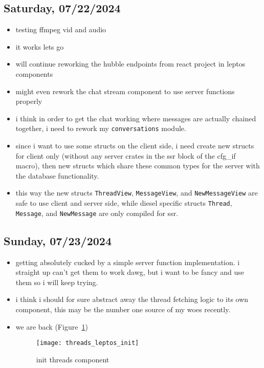 \subsection*{Saturday, 07/22/2024}
\begin{itemize}
    \item testing ffmpeg vid and audio
    \item it works lets go
    \item will continue reworking the hubble endpoints from react project in
        leptos components
    \item might even rework the chat stream component to use server functions
        properly
    \item i think in order to get the chat working where messages are actually
        chained together, i need to rework my \texttt{conversations} module.
    \item since i want to use some structs on the client side, i need create new
        structs for client only (without any server crates in the ssr block of
        the cfg_if macro), then new structs which share these common types for
        the server with the database functionality.
    \item this way the new structs \texttt{ThreadView}, \texttt{MessageView},
        and \texttt{NewMessageView} are safe to use client and server side,
        while diesel specific structs \texttt{Thread}, \texttt{Message}, and
        \texttt{NewMessage} are only compiled for ssr.
\end{itemize}

\subsection*{Sunday, 07/23/2024}
\begin{itemize}
    \item getting absolutely cucked by a simple server function implementation.
        i straight up can't get them to work dawg, but i want to be fancy and
        use them so i will keep trying.
    \item i think i should for sure abstract away the thread fetching logic to
        its own component, this may be the number one source of my woes
        recently.
    \item we are back (Figure~\ref{fig:threads_leptos_init})
        \begin{figure}[ht]
            \centering
            \texttt{[image: threads\_leptos\_init]}
            \captionsetup{labelfont=bf, textfont=it}
            \caption{init threads component}
            \label{fig:threads_leptos_init}
        \end{figure}
\end{itemize}
